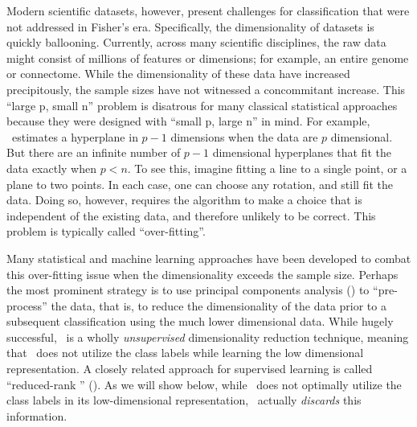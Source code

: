 \documentclass[10pt]{article}
\begin{document}
Modern scientific datasets, however, present challenges for classification that were not addressed in Fisher's era.
Specifically, the dimensionality of datasets is quickly ballooning.
Currently, across many scientific disciplines, the raw data might consist of millions  of features or dimensions; for example, an entire genome or connectome.  While the dimensionality of these data have increased precipitously, the sample sizes have not witnessed a concommitant increase.
This ``large p, small n'' problem is disatrous for many classical statistical approaches because they were designed with ``small p, large n'' in mind. For example, \Lda~estimates a hyperplane in $p-1$ dimensions when the data are $p$ dimensional.  But there are an infinite number of $p-1$ dimensional hyperplanes that fit the data exactly when $p<n$.  To see this, imagine fitting a line to a single point, or a plane to two points.  In each case, one can choose any rotation, and still fit the data.  Doing so, however, requires the algorithm to make a choice that is independent of the existing data, and therefore unlikely to be correct.  This problem is typically called ``over-fitting''.



Many statistical and machine learning approaches have been developed
to combat this over-fitting issue when the dimensionality exceeds the sample size.
Perhaps the most prominent strategy is to use principal components analysis (\Pca) \cite{PCA} to ``pre-process'' the data, that is, to reduce the dimensionality of the data prior to a subsequent classification using the much lower dimensional data.  While hugely successful, \Pca~is a wholly \emph{unsupervised} dimensionality reduction technique, meaning that \Pca~does not utilize the class labels while learning the low dimensional representation. A closely related approach for supervised learning is called ``reduced-rank \Lda'' (\Rrlda).  As we will show below, while \Pca~does not optimally utilize the class labels in its low-dimensional representation, \Rrlda~actually \emph{discards} this information.
\end{document}
